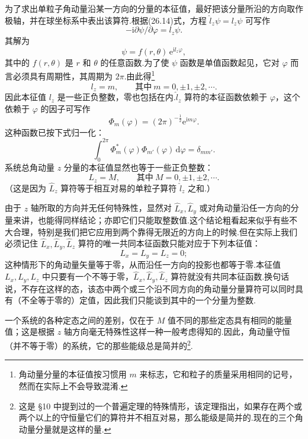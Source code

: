 为了求出单粒子角动量沿某一方向的分量的本征值，最好把该分量所沿的方向取作极轴，并在球坐标系中表出该算符.根据(26.14)式，方程 $\hat{l}_z\psi=l_z\psi$ 可写作
\begin{equation}
  -\mathrm{i}\partial\psi/\partial\varphi=l_z\psi.
\end{equation}
其解为
\begin{equation*}
  \psi=f(r,\theta)\,\mathrm{e}^{\mathrm{i}l_z\varphi},
\end{equation*}
其中的 $f(r,\theta)$ 是 $r$ 和 $\theta$ 的任意函数.为了使 $\psi$ 函数是单值函数起见，它对 $\varphi$ 而言必须具有周期性，其周期为 $2\pi$.由此得\footnote{角动量分量的本征值按习惯用 $m$ 来标志，它和粒子的质量采用相同的记号，然而在实际上不会导致混淆.}
\begin{equation}
  l_z=m,\qquad\text{其中}\ m=0,\pm1,\pm2,\cdots.
\end{equation}
因此本征值 $l_z$ 是一些正负整数，零也包括在内.$\hat{l}_z$ 算符的本征函数依赖于 $\varphi$，这个依赖于 $\varphi$ 的因子可写作
\begin{equation}
  \varPhi_m(\varphi)=(2\pi)^{-\frac{1}{2}}\mathrm{e}^{\mathrm{i}m\varphi}.
\end{equation}
这种函数已按下式归一化：
\begin{equation}
  \int_0^{2\pi}\varPhi_m^{*}(\varphi)\varPhi_{m'}(\varphi)\,\mathrm{d}\varphi
  =\delta_{mm'}.
\end{equation}
系统总角动量 $z$ 分量的本征值显然也等于一些正负整数：
\begin{equation}
  L_z=M,\qquad\text{其中}\ M=0,\pm1,\pm2,\cdots.
\end{equation}
（这是因为 $\hat{L}_z$ 算符等于相互对易的单粒子算符 $\hat{l}_z$ 之和.）

由于 $z$ 轴所取的方向并无任何特殊性，显然对 $\hat{L}_x,\hat{L}_y$ 或对角动量沿任一方向的分量来讲，也能得同样结论；亦即它们只能取整数值.这个结论粗看起来似乎有些不大合理，特别是我们把它应用到两个靠得无限近的方向上的时候.但在实际上我们必须记住 $\hat{L}_x,\hat{L}_y,\hat{L}_z$ 算符的唯一共同本征函数只能对应于下列本征值：
\begin{equation*}
  L_x=L_y=L_z=0;
\end{equation*}
这种情形下的角动量矢量等于零，从而沿任一方向的投影也都等于零.本征值 $L_x,L_y,L_z$ 中只要有一个不等于零，$\hat{L}_x,\hat{L}_y,\hat{L}_z$ 算符就没有共同本征函数.换句话说，不存在这样的态，该态中两个或三个沿不同方向的角动量分量算符可以同时具有（不全等于零的）定值，因此我们只能谈到其中的一个分量为整数.

一个系统的各种定态之间的差别，仅在于 $M$ 值不同的那些定态具有相同的能量值；这是根据 $z$ 轴方向毫无特殊性这样一种一般考虑得知的.因此，角动量守恒（并不等于零）的系统，它的那些能级总是简并的\footnote{这是 §10 中提到过的一个普遍定理的特殊情形，该定理指出，如果存在两个或两个以上的守恒量它们的算符并不相互对易，那么能级是简并的.现在的三个角动量分量就是这样的量.}.

